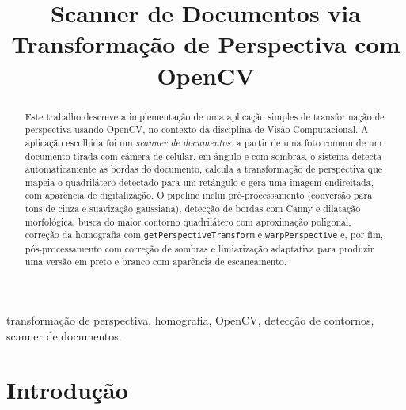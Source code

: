 \documentclass[conference]{IEEEtran}
\begin{document}
\title{Scanner de Documentos via Transformação de Perspectiva com OpenCV}

\author{
    \vspace{0.2cm}
}

\maketitle

\begin{abstract}
Este trabalho descreve a implementação de uma aplicação simples de transformação de perspectiva usando OpenCV, no contexto da disciplina de Visão Computacional. A aplicação escolhida foi um \emph{scanner de documentos}: a partir de uma foto comum de um documento tirada com câmera de celular, em ângulo e com sombras, o sistema detecta automaticamente as bordas do documento, calcula a transformação de perspectiva que mapeia o quadrilátero detectado para um retângulo e gera uma imagem endireitada, com aparência de digitalização. O pipeline inclui pré-processamento (conversão para tons de cinza e suavização gaussiana), detecção de bordas com Canny e dilatação morfológica, busca do maior contorno quadrilátero com aproximação poligonal, correção da homografia com \texttt{getPerspectiveTransform} e \texttt{warpPerspective} e, por fim, pós-processamento com correção de sombras e limiarização adaptativa para produzir uma versão em preto e branco com aparência de escaneamento.
\end{abstract}

\begin{IEEEkeywords}
transformação de perspectiva, homografia, OpenCV, detecção de contornos, scanner de documentos.
\end{IEEEkeywords}

\section{Introdução}
\end{document}
